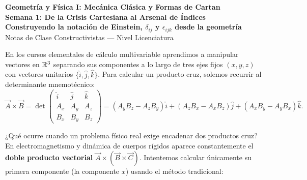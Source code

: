 \documentclass[11pt,letterpaper]{article}
\begin{document}
\setlength{\abovedisplayskip}{6pt}
\setlength{\belowdisplayskip}{6pt}
\setlength{\textfloatsep}{10pt}
\setlength{\intextsep}{8pt}
\color{blackmain}

\begin{center}
{\LARGE\textbf{Geometría y Física I: Mecánica Clásica y Formas de Cartan}}\\[0.25cm]
{\Large\textcolor{orangeacc}{\textbf{Semana 1: De la Crisis Cartesiana al Arsenal de Índices}}}\\[0.15cm]
{\large\textbf{Construyendo la notación de Einstein, $\delta_{ij}$ y $\epsilon_{ijk}$ desde la geometría}}\\[0.3cm]
{\large\textcolor{graymuted}{Notas de Clase Constructivistas --- Nivel Licenciatura}}\\[0.2cm]
\end{center}

\vspace{0.2cm}


En los cursos elementales de cálculo multivariable aprendimos a manipular vectores en $\mathbb{R}^3$ separando sus componentes a lo largo de tres ejes fijos $(x, y, z)$ con vectores unitarios $\{\hat{i}, \hat{j}, \hat{k}\}$. Para calcular un producto cruz, solemos recurrir al determinante mnemotécnico:
\[
\vec{A} \times \vec{B} = \det \begin{pmatrix} \hat{i} & \hat{j} & \hat{k} \\ A_x & A_y & A_z \\ B_x & B_y & B_z \end{pmatrix}
= (A_y B_z - A_z B_y)\hat{i} + (A_z B_x - A_x B_z)\hat{j} + (A_x B_y - A_y B_x)\hat{k}.
\]

¿Qué ocurre cuando un problema físico real exige encadenar dos productos cruz? En electromagnetismo y dinámica de cuerpos rígidos aparece constantemente el \textbf{doble producto vectorial} $\vec{A} \times (\vec{B} \times \vec{C})$. Intentemos calcular únicamente su primera componente (la componente $x$) usando el método tradicional:
\end{document}
